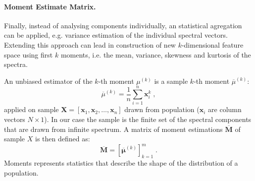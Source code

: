 

\paragraph*{Moment Estimate Matrix.}
Finally, instead of analysing components individually, an statistical agregation can be applied, e.g.
variance estimation of the individual spectral vectors. Extending this approach can lead in
construction of new $k$-dimensional feature space using first $k$ moments, i.e. the mean, variance,
skewness and kurtosis of the spectra.

An unbiased estimator of the $k$-th moment ${\mu^{(k)}}$ is a sample $k$-th moment 
$\overline{\mu}^{(k)}$:
\begin{equation}
\overline{\mu}^{(k)} = \frac{1}{n} \sum_{i=1}^n\mathbf{x}_i^k\;,
\end{equation}
applied on sample $\mathbf{X} = \left[ \mathbf{x}_1, \mathbf{x}_2, \dots, \mathbf{x}_n \right]$ 
drawn from population ($\mathbf{x}_i$ are column vectors $N\times 1$).
In our case the sample is the finite set of the spectral components that are drawn from 
infinite spectrum. A matrix of moment estimations $\overline{\mathbf{M}}$ of sample $X$ is 
then defined as:
\begin{equation}
	\overline{\mathbf{M}} = \left[ \overline{\mathbf{\mu}}^{(k)}\right]_{k=1}^m\;.
\end{equation}
Moments represents statistics that describe the shape of the distribution of a population.



